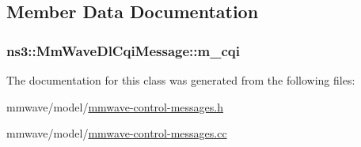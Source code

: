 \subsection{Member Data Documentation}
\subsubsection[{\texorpdfstring{m\+\_\+cqi}{m_cqi}}]{ ns3\+::\+Mm\+Wave\+Dl\+Cqi\+Message\+::m\+\_\+cqi\hspace{0.3cm}{\ttfamily [private]}}\hypertarget{classns3_1_1MmWaveDlCqiMessage_a7534f2768801d203923051ae65fc313f}{}\label{classns3_1_1MmWaveDlCqiMessage_a7534f2768801d203923051ae65fc313f}


The documentation for this class was generated from the following files\+:\begin{DoxyCompactItemize}
\item 
mmwave/model/\hyperlink{mmwave-control-messages_8h}{mmwave-\/control-\/messages.\+h}\item 
mmwave/model/\hyperlink{mmwave-control-messages_8cc}{mmwave-\/control-\/messages.\+cc}\end{DoxyCompactItemize}
